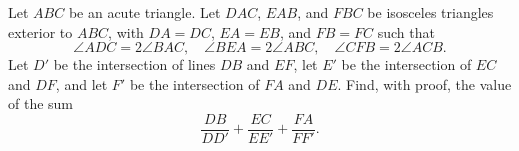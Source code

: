 Let $ABC$ be an acute triangle. Let $DAC$, $EAB$, and $FBC$ be isosceles triangles exterior to $ABC$, with $DA = DC$, $EA = EB$, and $FB = FC$ such that
\[ \angle ADC = 2\angle BAC, \quad \angle BEA = 2\angle ABC, \quad \angle CFB = 2\angle ACB. \]
Let $D'$ be the intersection of lines $DB$ and $EF$, let $E'$ be the intersection of $EC$ and $DF$, and let $F'$ be the intersection of $FA$ and $DE$. Find, with proof, the value of the sum
\[ \frac{DB}{DD'} + \frac{EC}{EE'} + \frac{FA}{FF'}. \]
